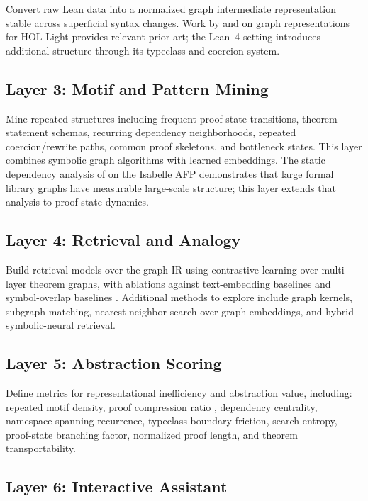\documentclass[12pt, a4paper]{article}
\begin{document}
Convert raw Lean data into a normalized graph intermediate representation
stable across superficial syntax changes. Work by \citet{paliwal2020graph}
and \citet{bansal2019holist} on graph representations for HOL Light provides
relevant prior art; the Lean~4 setting introduces additional structure through
its typeclass and coercion system.

\subsection{Layer 3: Motif and Pattern Mining}

Mine repeated structures including frequent proof-state transitions, theorem
statement schemas, recurring dependency neighborhoods, repeated
coercion/rewrite paths, common proof skeletons, and bottleneck states. This
layer combines symbolic graph algorithms with learned embeddings. The static
dependency analysis of \citet{huch2022} on the Isabelle AFP demonstrates that
large formal library graphs have measurable large-scale structure; this layer
extends that analysis to proof-state dynamics.

\subsection{Layer 4: Retrieval and Analogy}

Build retrieval models over the graph IR using contrastive learning over
multi-layer theorem graphs, with ablations against text-embedding baselines
\citep{gao2024leansearch} and symbol-overlap baselines \citep{meng2009mepo}.
Additional methods to explore include graph kernels, subgraph matching,
nearest-neighbor search over graph embeddings, and hybrid symbolic-neural
retrieval.

\subsection{Layer 5: Abstraction Scoring}

Define metrics for representational inefficiency and abstraction value,
including: repeated motif density, proof compression ratio
\citep{bowers2023stitch}, dependency centrality, namespace-spanning
recurrence, typeclass boundary friction, search entropy, proof-state
branching factor, normalized proof length, and theorem transportability.

\subsection{Layer 6: Interactive Assistant}
\end{document}
